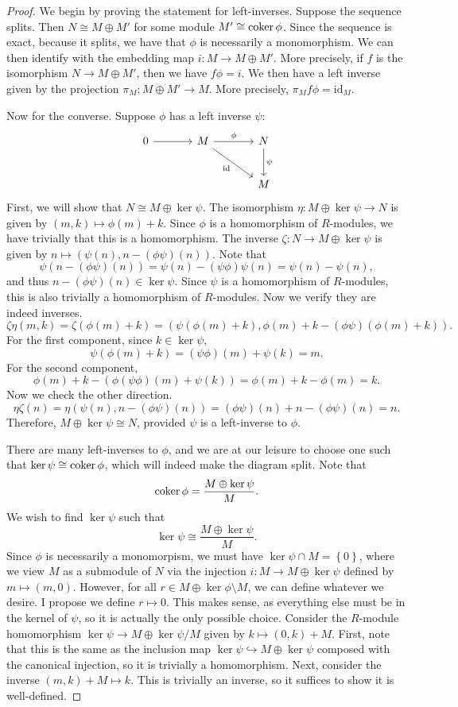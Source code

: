 \begin{proof}
	We begin by proving the statement for left-inverses. Suppose the sequence splits. Then $N\cong M \oplus M'$ for some module $M'\cong \operatorname{coker} \phi $. Since the sequence is exact, because it splits, we have that $\phi  $ is necessarily a monomorphism. We can then identify with the embedding map $i : M \to M \oplus M'$. More precisely, if $f$ is the isomorphism $N\to M\oplus M'$, then we have $f\phi =i$. We then have a left inverse given by the projection $\pi_M : M\oplus M' \to M$. More precisely, $\pi_M f\phi = \mathrm{id}_{M}$.

	Now for the converse. Suppose $\phi $ has a left inverse $\psi $:
	\[\begin{tikzcd}[row sep=2.5em, column sep=3.5em]
		0\arrow[r]&M\arrow[r, "\phi "]\arrow[dr, "\mathrm{id}"']&N\arrow[d, "\psi "]\\
			  &&M
	\end{tikzcd}\]
	First, we will show that $N\cong M\oplus \ker \psi $. The isomorphism $\eta : M\oplus \ker \psi \to N$ is given by $(m,k)\mapsto \phi (m)+k$. Since $\phi $ is a homomorphism of $R$-modules, we have trivially that this is a homomorphism. The inverse $\zeta : N\to M\oplus \ker \psi $ is given by $n\mapsto (\psi (n),n-(\phi \psi )(n))$. Note that
	\[
		\psi (n-(\phi \psi )(n))=\psi (n)-(\psi \phi )\psi (n)=\psi (n)-\psi (n)
	,\]
	and thus $n-(\phi \psi )(n)\in \ker \psi $. Since $\psi $ is a homomorphism of $R$-modules, this is also trivially a homomorphism of $R$-modules. Now we verify they are indeed inverses.
	\[
		\zeta \eta (m,k)=\zeta (\phi (m)+k)=(\psi (\phi (m)+k),\phi (m)+k-(\phi \psi )(\phi (m)+k))
	.\]
	For the first component, since $k\in \ker \psi $,
	\[
		\psi (\phi (m)+k)=(\psi \phi )(m)+\psi (k)=m
	.\]
	For the second component,
	\[
		\phi (m)+k-(\phi (\psi \phi )(m) + \psi (k))=\phi (m)+k-\phi (m)=k
	.\]
	Now we check the other direction.
	\[
		\eta \zeta (n)=\eta (\psi (n),n-(\phi \psi )(n))=(\phi \psi )(n)+n-(\phi \psi )(n)=n
	.\]
	Therefore, $M\oplus \ker \psi \cong N$, provided $\psi $ is a left-inverse to $\phi $.

	There are many left-inverses to $\phi $, and we are at our leisure to choose one such that $\ker \psi \cong \operatorname{coker} \phi $, which will indeed make the diagram split. Note that
	\[
		\operatorname{coker} \phi = \frac{M\oplus \ker \psi }{M}
	.\]
	We wish to find $\ker \psi $ such that
	\[
		\ker \psi \cong \frac{M\oplus \ker \psi }{M}
	.\]
	Since $\phi $ is necessarily a monomorpism, we must have $\ker \psi \cap M=\left\{ 0 \right\} $, where we view $M$ as a submodule of $N$ via the injection $i : M \to M\oplus \ker \psi $ defined by $m\mapsto (m,0)$. However, for all $r\in M\oplus \ker \phi \setminus M$, we can define whatever we desire. I propose we define $r\mapsto 0$. This makes sense, as everything else must be in the kernel of $\psi $, so it is actually the only possible choice. Consider the $R$-module homomorphism $\ker \psi \to M\oplus \ker \psi /M$ given by $k\mapsto (0,k)+M$. First, note that this is the same as the inclusion map $\ker \psi \hookrightarrow M\oplus \ker \psi $ composed with the canonical injection, so it is trivially a homomorphism. Next, consider the inverse $(m,k)+M\mapsto k$. This is trivially an inverse, so it suffices to show it is well-defined.


\end{proof}
